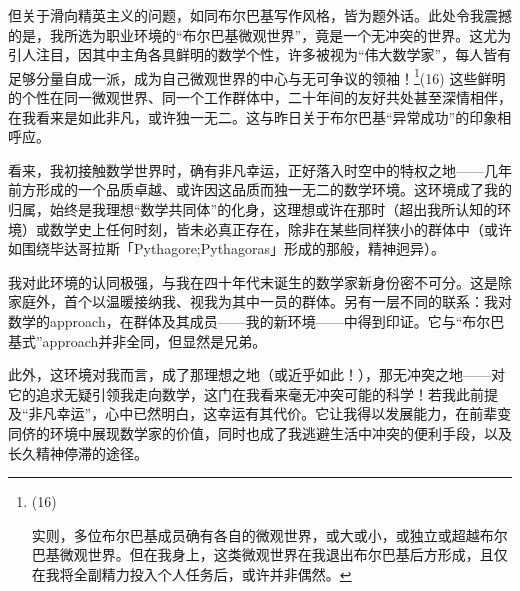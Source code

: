 但关于滑向精英主义的问题，如同布尔巴基写作风格，皆为题外话。此处令我震撼的是，我所选为职业环境的“布尔巴基微观世界”，竟是一个无冲突的世界。这尤为引人注目，因其中主角各具鲜明的数学个性，许多被视为“伟大数学家”，每人皆有足够分量自成一派，成为自己微观世界的中心与无可争议的领袖！\footnote{(16)\par 实则，多位布尔巴基成员确有各自的微观世界，或大或小，或独立或超越布尔巴基微观世界。但在我身上，这类微观世界在我退出布尔巴基后方形成，且仅在我将全副精力投入个人任务后，或许并非偶然。}(16) 这些鲜明的个性在同一微观世界、同一个工作群体中，二十年间的友好共处甚至深情相伴，在我看来是如此非凡，或许独一无二。这与昨日关于布尔巴基“异常成功”的印象相呼应。

看来，我初接触数学世界时，确有非凡幸运，正好落入时空中的特权之地——几年前方形成的一个品质卓越、或许因这品质而独一无二的数学环境。这环境成了我的归属，始终是我理想“数学共同体”的化身，这理想或许在那时（超出我所认知的环境）或数学史上任何时刻，皆未必真正存在，除非在某些同样狭小的群体中（或许如围绕毕达哥拉斯「Pythagore;Pythagoras」形成的那般，精神迥异）。

我对此环境的认同极强，与我在四十年代末诞生的数学家新身份密不可分。这是除家庭外，首个以温暖接纳我、视我为其中一员的群体。另有一层不同的联系：我对数学的approach，在群体及其成员——我的新环境——中得到印证。它与“布尔巴基式”approach并非全同，但显然是兄弟。

此外，这环境对我而言，成了那理想之地（或近乎如此！），那无冲突之地——对它的追求无疑引领我走向数学，这门在我看来毫无冲突可能的科学！若我此前提及“非凡幸运”，心中已然明白，这幸运有其代价。它让我得以发展能力，在前辈变同侪的环境中展现数学家的价值，同时也成了我逃避生活中冲突的便利手段，以及长久精神停滞的途径。